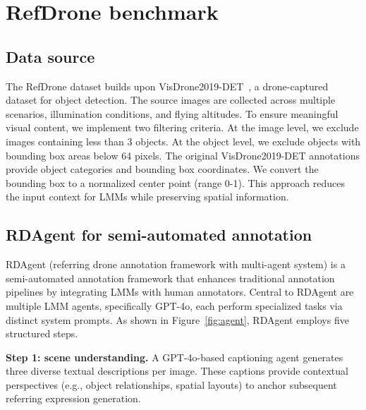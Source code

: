 
\section{RefDrone benchmark}

\subsection{Data source}
The RefDrone dataset builds upon VisDrone2019-DET~\cite{visdrone}, a drone-captured dataset for object detection. The source images are collected across multiple scenarios, illumination conditions, and flying altitudes. To ensure meaningful visual content, we implement two filtering criteria. At the image level, we exclude images containing less than 3 objects. At the object level, we exclude objects with bounding box areas below 64 pixels. The original VisDrone2019-DET annotations provide object categories and bounding box coordinates. We convert the bounding box to a normalized center point (range 0-1). This approach reduces the input context for LMMs while preserving spatial information.\par

\subsection{RDAgent for semi-automated annotation}
RDAgent (referring drone annotation framework with multi-agent system) is a semi-automated annotation framework that enhances traditional annotation pipelines by integrating LMMs with human annotators. Central to RDAgent are multiple LMM agents, specifically GPT-4o, each perform specialized tasks via distinct system prompts. As shown in Figure~\ref{fig:agent}, RDAgent employs five structured steps.\par




\textbf{Step 1: scene understanding.} A GPT-4o-based captioning agent generates three diverse textual descriptions per image. These captions provide contextual perspectives (e.g., object relationships, spatial layouts) to anchor subsequent referring expression generation.\par

